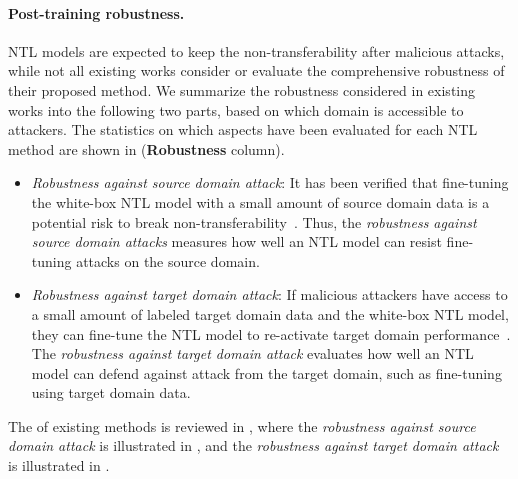 \paragraph{Post-training robustness.} 
NTL models are expected to keep the non-transferability after malicious attacks,
while not all existing works consider or evaluate the comprehensive robustness of their proposed method. 
We summarize the robustness considered in existing works into the following two parts, based on which domain is accessible to attackers.
The statistics on which aspects have been evaluated for each NTL method are shown in  (\textbf{Robustness} column).
\begin{itemize}[leftmargin=*, topsep=0pt]\setlength{\parskip}{0pt}
    \item \textit{Robustness against source domain attack}: 
    It has been verified that fine-tuning the white-box NTL model with a small amount of source domain data is a potential risk to break non-transferability~\cite{hong2024your,wang2021non,wang2024say}. Thus, the \textit{robustness against source domain attacks} measures how well an NTL model can resist fine-tuning attacks on the source domain.
    \item \textit{Robustness against target domain attack}: If malicious attackers have access to a small amount of labeled target domain data and the white-box NTL model, they can fine-tune the NTL model to re-activate target domain performance~\cite{deng2024sophon,ding2024non}.
    The \textit{robustness against target domain attack} evaluates how well an NTL model can defend against attack from the target domain, such as fine-tuning using target domain data.
\end{itemize}
The  of existing methods is reviewed in , where the \textit{robustness against source domain attack} is illustrated in , and the \textit{robustness against target domain attack} is illustrated in .
 
